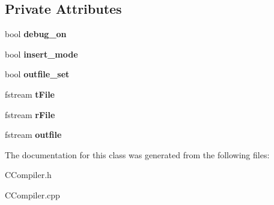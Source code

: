 \subsection*{Private Attributes}
\begin{DoxyCompactItemize}
\item 
\hypertarget{classCCompiler_a3d8342e750d676effe2ee92161129360}{bool {\bfseries debug\-\_\-on}}\label{classCCompiler_a3d8342e750d676effe2ee92161129360}

\item 
\hypertarget{classCCompiler_a26d9cf998c4bb1fd8a1f115ee5a23123}{bool {\bfseries insert\-\_\-mode}}\label{classCCompiler_a26d9cf998c4bb1fd8a1f115ee5a23123}

\item 
\hypertarget{classCCompiler_a769915c7fae8eb76d704c0735c90dffa}{bool {\bfseries outfile\-\_\-set}}\label{classCCompiler_a769915c7fae8eb76d704c0735c90dffa}

\item 
\hypertarget{classCCompiler_a9b1dffb0bbfbe87f667dae2fbb4bf12b}{fstream {\bfseries t\-File}}\label{classCCompiler_a9b1dffb0bbfbe87f667dae2fbb4bf12b}

\item 
\hypertarget{classCCompiler_a1d71bda765bab9dff0b56660237125ac}{fstream {\bfseries r\-File}}\label{classCCompiler_a1d71bda765bab9dff0b56660237125ac}

\item 
\hypertarget{classCCompiler_ab2b012bff98533fc4eaeb36c36a3dea9}{fstream {\bfseries outfile}}\label{classCCompiler_ab2b012bff98533fc4eaeb36c36a3dea9}

\end{DoxyCompactItemize}


The documentation for this class was generated from the following files\-:\begin{DoxyCompactItemize}
\item 
C\-Compiler.\-h\item 
C\-Compiler.\-cpp\end{DoxyCompactItemize}
